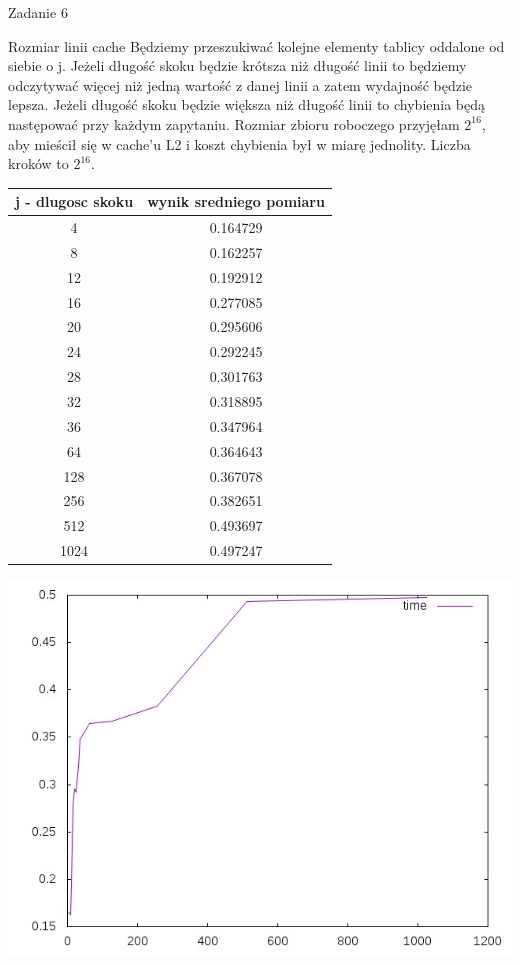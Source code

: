 \documentclass[11pt,wide]{mwart}
\begin{document}
\begin{section}{Zadanie 6}
\begin{subsection}{Rozmiar linii cache}
Będziemy przeszukiwać kolejne elementy tablicy oddalone od siebie o j. Jeżeli długość skoku będzie krótsza niż długość linii to będziemy odczytywać więcej niż jedną wartość z danej linii a zatem wydajność będzie lepsza. Jeżeli długość skoku będzie większa niż długość linii to chybienia będą następować przy każdym zapytaniu. Rozmiar zbioru roboczego przyjęłam \(2^{16}\), aby mieścił się w cache'u L2 i koszt chybienia był w miarę jednolity. Liczba kroków to \(2^{16}\).
\begin{center}
\begin{tabular}{|c|c|}
\hline
j - dlugosc skoku & wynik sredniego pomiaru \\
\hline
4 & 0.164729\\
\hline
8 & 0.162257\\
\hline
12 & 0.192912\\
\hline
16 & 0.277085\\
\hline
20 & 0.295606\\
\hline
24 & 0.292245\\
\hline
28 & 0.301763\\
\hline
32 & 0.318895\\
\hline
36 & 0.347964\\
\hline
64 & 0.364643\\
\hline
128 & 0.367078\\
\hline
256 & 0.382651\\
\hline
512 & 0.493697\\
\hline
1024 & 0.497247\\
\hline
\end{tabular}
\includegraphics[scale=0.75]{wykres6a.jpg}
\end{center}


\end{subsection}
\end{section}
\end{document}
